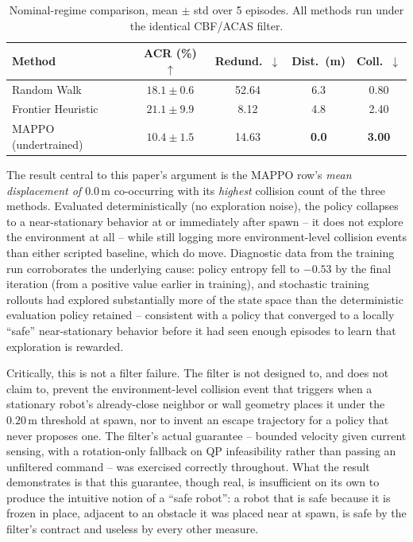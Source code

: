 \documentclass[12pt]{article}
\newcommand{\si}[1]{\mathrm{#1}}
\begin{document}
\begin{table}[h]
\centering
\caption{Nominal-regime comparison, mean $\pm$ std over 5 episodes. All
methods run under the identical CBF/ACAS filter.}
\label{tab:main}
\begin{tabular}{@{}lcccc@{}}
\toprule
Method & ACR (\%) $\uparrow$ & Redund.\ $\downarrow$ & Dist.\ (m) & Coll.\ $\downarrow$ \\
\midrule
Random Walk        & $18.1\pm0.6$ & 52.64 & 6.3 & 0.80 \\
Frontier Heuristic & $21.1\pm9.9$ & 8.12  & 4.8 & 2.40 \\
MAPPO (undertrained) & $10.4\pm1.5$ & 14.63 & \textbf{0.0} & \textbf{3.00} \\
\bottomrule
\end{tabular}
\end{table}

The result central to this paper's argument is the MAPPO row's
\emph{mean displacement of $0.0\,\si{m}$} co-occurring with its
\emph{highest} collision count of the three methods. Evaluated
deterministically (no exploration noise), the policy collapses to a
near-stationary behavior at or immediately after spawn -- it does not explore
the environment at all -- while still logging more environment-level
collision events than either scripted baseline, which do move. Diagnostic
data from the training run corroborates the underlying cause: policy entropy
fell to $-0.53$ by the final iteration (from a positive value earlier in
training), and stochastic training rollouts had explored substantially more
of the state space than the deterministic evaluation policy retained --
consistent with a policy that converged to a locally ``safe'' near-stationary
behavior before it had seen enough episodes to learn that exploration is
rewarded.

Critically, this is not a filter failure. The filter is not designed to,
and does not claim to, prevent the environment-level collision event that
triggers when a stationary robot's already-close neighbor or wall geometry
places it under the $0.20\,\si{m}$ threshold at spawn, nor to invent an
escape trajectory for a policy that never proposes one. The filter's actual
guarantee -- bounded velocity given current sensing, with a rotation-only
fallback on QP infeasibility rather than passing an unfiltered command -- was
exercised correctly throughout. What the result demonstrates is that this
guarantee, though real, is insufficient on its own to produce the intuitive
notion of a ``safe robot'': a robot that is safe because it is frozen in
place, adjacent to an obstacle it was placed near at spawn, is safe by the
filter's contract and useless by every other measure.
\end{document}
